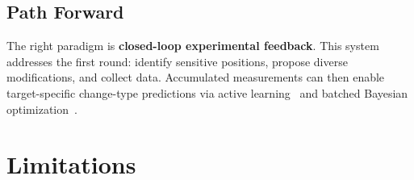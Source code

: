 \documentclass[sigconf, nonacm]{acmart}
\begin{document}
\subsection{Path Forward}

The right paradigm is \textbf{closed-loop experimental feedback}. This system addresses the first round: identify sensitive positions, propose diverse modifications, and collect data. Accumulated measurements can then enable target-specific change-type predictions via active learning~\cite{Reker2020,vanTilborg2022} and batched Bayesian optimization~\cite{Bellamy2022}.

\section{Limitations}
\end{document}
